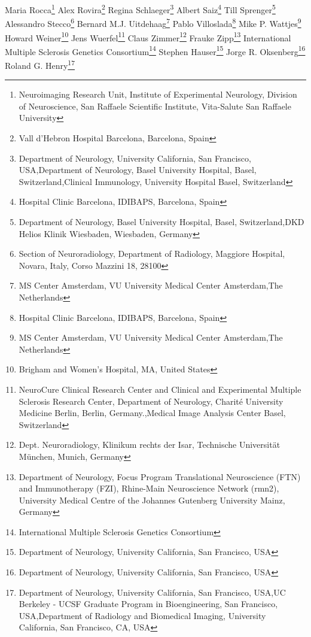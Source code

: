 Maria Rocca\footnote[14]{Neuroimaging Research Unit, Institute of Experimental Neurology, Division of Neuroscience, San Raffaele Scientific Institute, Vita-Salute San Raffaele University}
Alex Rovira\footnote[10]{Vall d’Hebron Hospital Barcelona, Barcelona, Spain}
Regina Schlaeger\footnote[1,6,8]{Department of Neurology, University California, San Francisco,  USA,Department of Neurology, Basel University Hospital, Basel, Switzerland,Clinical Immunology, University Hospital Basel, Switzerland}
Albert Saiz\footnote[21]{Hospital Clinic Barcelona, IDIBAPS, Barcelona, Spain}
Till Sprenger\footnote[6,24]{Department of Neurology, Basel University Hospital, Basel, Switzerland,DKD Helios Klinik Wiesbaden, Wiesbaden, Germany}
Alessandro Stecco\footnote[25]{Section of Neuroradiology, Department of Radiology, Maggiore Hospital, Novara, Italy, Corso Mazzini 18, 28100}
Bernard M.J. Uitdehaag\footnote[26]{MS Center Amsterdam, VU University Medical Center Amsterdam,The Netherlands}
Pablo Villoslada\footnote[21]{Hospital Clinic Barcelona, IDIBAPS, Barcelona, Spain}
Mike P. Wattjes\footnote[26]{MS Center Amsterdam, VU University Medical Center Amsterdam,The Netherlands}
Howard Weiner\footnote[7]{Brigham and Women's Hospital, MA, United States}
Jens Wuerfel\footnote[3,27]{NeuroCure Clinical Research Center and Clinical and Experimental Multiple Sclerosis Research Center, Department of Neurology, Charité University Medicine Berlin, Berlin, Germany.,Medical Image Analysis Center Basel, Switzerland}
Claus Zimmer\footnote[28]{Dept. Neuroradiology, Klinikum rechts der Isar, Technische Universität München, Munich, Germany}
Frauke Zipp\footnote[17]{Department of Neurology, Focus Program Translational Neuroscience (FTN) and Immunotherapy (FZI), Rhine-Main Neuroscience Network (rmn2), University Medical Centre of the Johannes Gutenberg University Mainz, Germany}
International Multiple Sclerosis Genetics Consortium\footnote[29]{International Multiple Sclerosis Genetics Consortium}
Stephen Hauser\footnote[1]{Department of Neurology, University California, San Francisco,  USA}
Jorge R. Oksenberg\footnote[1]{Department of Neurology, University California, San Francisco,  USA}
Roland G. Henry\footnote[1,2,11]{Department of Neurology, University California, San Francisco,  USA,UC Berkeley - UCSF Graduate Program in Bioengineering, San Francisco, USA,Department of Radiology and Biomedical Imaging, University California, San Francisco, CA, USA}

\else %

